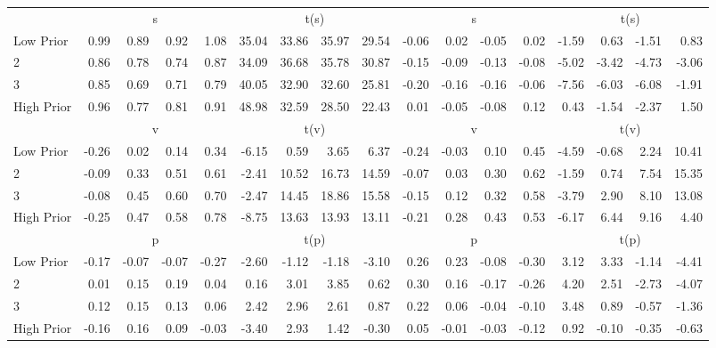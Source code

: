 \begin{table}[!ht]
\begin{tabular}{lrrrrrrrrrrrrrrrr}
  
     & \multicolumn{4}{c}{s} & \multicolumn{4}{c}{t(s)}  & \multicolumn{4}{c}{s} & \multicolumn{4}{c}{t(s)}   \\
     \cmidrule(r){2-5} \cmidrule(r){6-9}  \cmidrule(r){10-13} \cmidrule(r){14-17} 
    Low Prior  & 0.99  & 0.89  & 0.92  & 1.08  & 35.04  & 33.86  & 35.97  & 29.54  & -0.06  & 0.02  & -0.05  & 0.02  & -1.59  & 0.63  & -1.51  & 0.83   \\
    2  & 0.86  & 0.78  & 0.74  & 0.87  & 34.09  & 36.68  & 35.78  & 30.87  & -0.15  & -0.09  & -0.13  & -0.08  & -5.02  & -3.42  & -4.73  & -3.06   \\
    3  & 0.85  & 0.69  & 0.71  & 0.79  & 40.05  & 32.90  & 32.60  & 25.81  & -0.20  & -0.16  & -0.16  & -0.06  & -7.56  & -6.03  & -6.08  & -1.91   \\
    High Prior  & 0.96  & 0.77  & 0.81  & 0.91  & 48.98  & 32.59  & 28.50  & 22.43  & 0.01  & -0.05  & -0.08  & 0.12  & 0.43  & -1.54  & -2.37  & 1.50   \\
    
  
     & \multicolumn{4}{c}{v} & \multicolumn{4}{c}{t(v)}  & \multicolumn{4}{c}{v} & \multicolumn{4}{c}{t(v)}   \\
     \cmidrule(r){2-5} \cmidrule(r){6-9}  \cmidrule(r){10-13} \cmidrule(r){14-17} 
    Low Prior  & -0.26  & 0.02  & 0.14  & 0.34  & -6.15  & 0.59  & 3.65  & 6.37  & -0.24  & -0.03  & 0.10  & 0.45  & -4.59  & -0.68  & 2.24  & 10.41   \\
    2  & -0.09  & 0.33  & 0.51  & 0.61  & -2.41  & 10.52  & 16.73  & 14.59  & -0.07  & 0.03  & 0.30  & 0.62  & -1.59  & 0.74  & 7.54  & 15.35   \\
    3  & -0.08  & 0.45  & 0.60  & 0.70  & -2.47  & 14.45  & 18.86  & 15.58  & -0.15  & 0.12  & 0.32  & 0.58  & -3.79  & 2.90  & 8.10  & 13.08   \\
    High Prior  & -0.25  & 0.47  & 0.58  & 0.78  & -8.75  & 13.63  & 13.93  & 13.11  & -0.21  & 0.28  & 0.43  & 0.53  & -6.17  & 6.44  & 9.16  & 4.40   \\
    
  
     & \multicolumn{4}{c}{p} & \multicolumn{4}{c}{t(p)}  & \multicolumn{4}{c}{p} & \multicolumn{4}{c}{t(p)}   \\
     \cmidrule(r){2-5} \cmidrule(r){6-9}  \cmidrule(r){10-13} \cmidrule(r){14-17} 
    Low Prior  & -0.17  & -0.07  & -0.07  & -0.27  & -2.60  & -1.12  & -1.18  & -3.10  & 0.26  & 0.23  & -0.08  & -0.30  & 3.12  & 3.33  & -1.14  & -4.41   \\
    2  & 0.01  & 0.15  & 0.19  & 0.04  & 0.16  & 3.01  & 3.85  & 0.62  & 0.30  & 0.16  & -0.17  & -0.26  & 4.20  & 2.51  & -2.73  & -4.07   \\
    3  & 0.12  & 0.15  & 0.13  & 0.06  & 2.42  & 2.96  & 2.61  & 0.87  & 0.22  & 0.06  & -0.04  & -0.10  & 3.48  & 0.89  & -0.57  & -1.36   \\
    High Prior  & -0.16  & 0.16  & 0.09  & -0.03  & -3.40  & 2.93  & 1.42  & -0.30  & 0.05  & -0.01  & -0.03  & -0.12  & 0.92  & -0.10  & -0.35  & -0.63   \\
    

\end{tabular}
\end{table}
